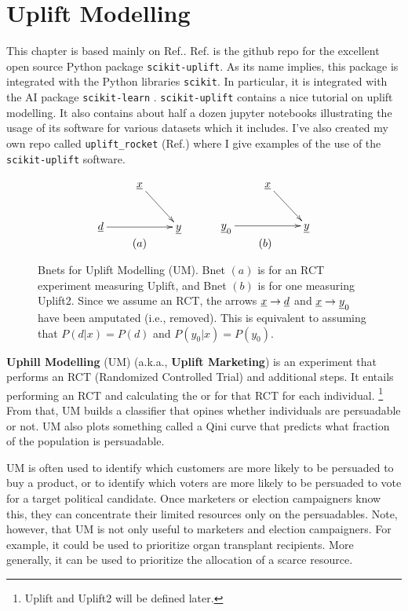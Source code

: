 \chapter{Uplift Modelling}
\label{ch-uplift}


This chapter is based mainly on Ref.\cite{scikit-uplift}.
Ref.\cite{scikit-uplift} is the github repo for
the excellent open source Python package {\tt scikit-uplift}.
As its name implies, this package is
integrated with the Python libraries {\tt scikit}. In particular, it is integrated with
the AI package {\tt scikit-learn} .
 {\tt scikit-uplift} contains a nice tutorial 
 on uplift modelling. It also contains about half a dozen
jupyter notebooks illustrating the usage
of its software for various datasets which it includes. I've also created
my own repo called {\tt uplift\_rocket}
(Ref.\cite{uplift_rocket})
where I give examples of the use of
the {\tt scikit-uplift}  software.



\begin{figure}[h!]
$$\begin{array}{ccc}
\xymatrix{
&\rvx\ar[dr]
\\
\rvd\ar[rr]
&&\rvy
}
&\quad&
\xymatrix{
&\rvx\ar[dr]
\\
\rvy_0\ar[rr]
&&\rvy
}
\\
(a) &\quad & (b)
\end{array}
$$
\caption{Bnets for Uplift Modelling (UM). 
Bnet $(a)$ is for an RCT experiment measuring Uplift, and Bnet $(b)$ is for one measuring Uplift2. 
 Since we assume an RCT, the arrows $\rvx\rarrow \rvd$ 
and $\rvx\rarrow \rvy_0$ have been amputated (i.e., removed). This is equivalent to assuming that $P(d|x)=P(d)$ and
$P(y_0|x)=P(y_0)$.
}
\label{fig-up-bnet}
\end{figure}


{\bf Uphill Modelling} (UM) (a.k.a., {\bf Uplift Marketing})
is an experiment that performs an
RCT (Randomized Controlled Trial) and additional steps. It 
entails performing an
RCT  and 
 calculating  the  or  for that  RCT
 for each individual.
 \footnote{Uplift and Uplift2 will be defined later.}
From that, UM builds a classifier that opines whether individuals are
persuadable or not. UM also plots something called a Qini curve that predicts
what fraction of the population is persuadable. 

UM is often used to identify which 
customers are more likely to be persuaded to buy a
product, or to identify which voters are more
likely to be persuaded to vote for a target political candidate.
Once marketers or election campaigners know this, they can concentrate their limited resources only on the persuadables. Note, however, that UM is not only useful
to marketers and election campaigners. For example, it could be used to prioritize organ transplant recipients. 
More generally, it can be used to
prioritize the allocation of 
a scarce resource.

